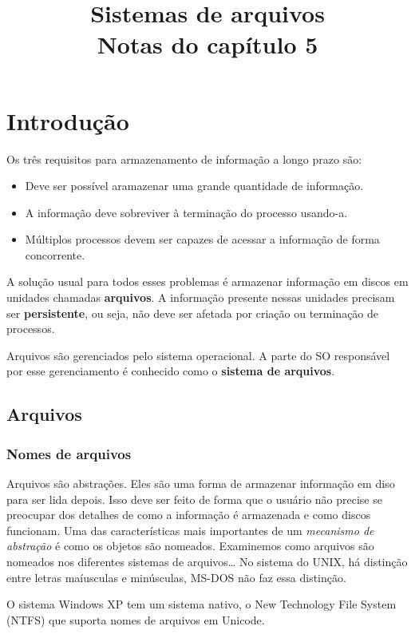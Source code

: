 \documentclass{article}
\title{Sistemas de arquivos \\ {\large \color{red}Notas do capítulo 5}}
\begin{document}
\maketitle

\section{Introdução}
Os três requisitos para armazenamento de informação a longo prazo são:

\begin{itemize}
  \item Deve ser possível aramazenar uma grande quantidade de informação.
  \item A informação deve sobreviver à terminação do processo usando-a. 
  \item Múltiplos processos devem ser capazes de acessar a informação de forma concorrente.
\end{itemize}

A solução usual para todos esses problemas é armazenar informação em discos em unidades chamadas \textbf{arquivos}. A informação presente nessas unidades precisam ser \textbf{persistente}, ou seja, não deve ser afetada por criação ou terminação de processos.

Arquivos são gerenciados pelo sistema operacional. A parte do SO responsável por esse gerenciamento é conhecido como o \textbf{sistema de arquivos}.

\subsection{Arquivos}

\subsubsection{Nomes de arquivos}
Arquivos são abstrações. Eles são uma forma de armazenar informação em diso para ser lida depois. Isso deve ser feito de forma que o usuário não precise se preocupar dos detalhes de como a informação é armazenada e como discos funcionam. Uma das características mais importantes de um \textit{mecanismo de abstração} é como os objetos são nomeados. Examinemos como arquivos são nomeados nos diferentes sistemas de arquivos\dots
No sistema do UNIX, há distinção entre letras maíusculas e minúsculas, MS-DOS não faz essa distinção.

O sistema Windows XP tem um sistema nativo, o New Technology File System (NTFS) que suporta nomes de arquivos em Unicode. 
\end{document}
